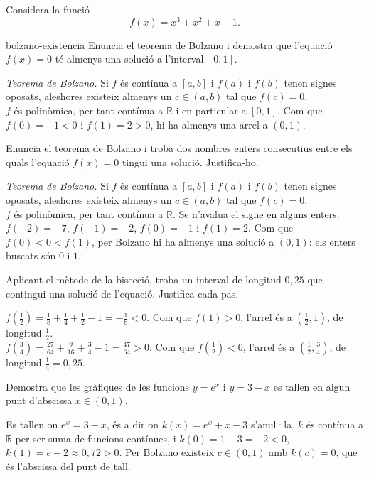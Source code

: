 Considera la funció
\[
f(x)=x^3+x^2+x-1 .
\]

\begin{apartats}

\begin{tria}{bolzano-existencia}
Enuncia el teorema de Bolzano i demostra que l'equació $f(x)=0$ té almenys una solució
a l'interval $[0,1]$.

\begin{solucio}
\emph{Teorema de Bolzano.} Si $f$ és contínua a $[a,b]$ i $f(a)$ i $f(b)$ tenen signes
oposats, aleshores existeix almenys un $c\in(a,b)$ tal que $f(c)=0$.\\
$f$ és polinòmica, per tant contínua a $\mathbb{R}$ i en particular a $[0,1]$.
Com que $f(0)=-1<0$ i $f(1)=2>0$, hi ha almenys una arrel a $(0,1)$.
\end{solucio}

Enuncia el teorema de Bolzano i troba dos nombres enters consecutius entre els quals
l'equació $f(x)=0$ tingui una solució. Justifica-ho.

\begin{solucio}
\emph{Teorema de Bolzano.} Si $f$ és contínua a $[a,b]$ i $f(a)$ i $f(b)$ tenen signes
oposats, aleshores existeix almenys un $c\in(a,b)$ tal que $f(c)=0$.\\
$f$ és polinòmica, per tant contínua a $\mathbb{R}$. Se n'avalua el signe en alguns enters:
$f(-2)=-7$, $f(-1)=-2$, $f(0)=-1$ i $f(1)=2$. Com que $f(0)<0<f(1)$, per Bolzano hi ha
almenys una solució a $(0,1)$: els enters buscats són $0$ i $1$.
\end{solucio}
\end{tria}

Aplicant el mètode de la bisecció, troba un interval de longitud $0{,}25$ que contingui
una solució de l'equació. Justifica cada pas.

\begin{solucio}
$f\!\left(\tfrac12\right)=\tfrac18+\tfrac14+\tfrac12-1=-\tfrac18<0$. Com que
$f(1)>0$, l'arrel és a $\left(\tfrac12,1\right)$, de longitud $\tfrac12$.\\
$f\!\left(\tfrac34\right)=\tfrac{27}{64}+\tfrac{9}{16}+\tfrac34-1=\tfrac{47}{64}>0$.
Com que $f\!\left(\tfrac12\right)<0$, l'arrel és a
$\left(\tfrac12,\tfrac34\right)$, de longitud $\tfrac14=0{,}25$.
\end{solucio}

\begin{nomesllarg}
Demostra que les gràfiques de les funcions $y=e^{x}$ i $y=3-x$ es tallen en algun punt
d'abscissa $x\in(0,1)$.

\begin{solucio}
Es tallen on $e^x=3-x$, és a dir on $k(x)=e^x+x-3$ s'anul·la. $k$ és contínua a
$\mathbb{R}$ per ser suma de funcions contínues, i
$k(0)=1-3=-2<0$, $k(1)=e-2\approx0{,}72>0$.
Per Bolzano existeix $c\in(0,1)$ amb $k(c)=0$, que és l'abscissa del punt de tall.
\end{solucio}
\end{nomesllarg}

\end{apartats}
